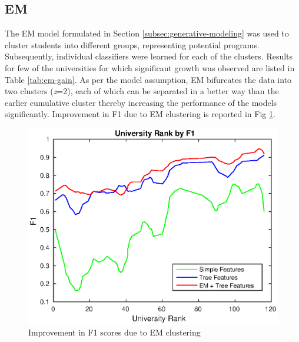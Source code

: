 \documentclass{sig-alternate-05-2015}
\begin{document}
\subsection{EM}
\label{subsec:em-exp}
The EM model formulated in Section \ref{subsec:generative-modeling} was used to cluster students into different groups, representing potential programs. Subsequently, individual classifiers were learned for each of the clusters. Results for few of the universities for which significant growth was observed are listed in Table \ref{tab:em-gain}. As per the model assumption, EM bifurcates the data into two clusters (\textit{z}=2), each of which can be separated in a better way than the earlier cumulative cluster thereby increasing the performance of the models significantly. Improvement in F1 due to EM clustering is reported in Fig \ref{fig:simple_vs_tree_vs_em}.

\begin{figure}
\centering
\includegraphics[scale=0.6]{simple_vs_tree_vs_em.eps}
\caption{Improvement in F1 scores due to EM clustering}
\label{fig:simple_vs_tree_vs_em}
\end{figure}
\end{document}
